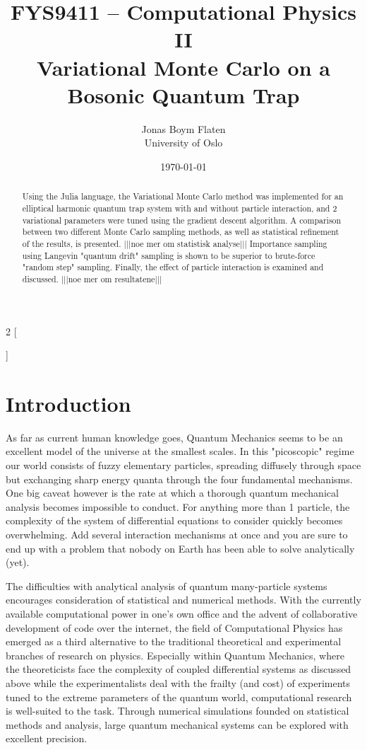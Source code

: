 \documentclass[a4paper,8pt]{article}
\title{\small FYS9411 – Computational Physics II \\
\huge Variational Monte Carlo on a Bosonic Quantum Trap}
\author{\large Jonas Boym Flaten \\
\small University of Oslo}
\date{\today}
\begin{document}
\begin{multicols}{2}
[
\maketitle
\begin{abstract}
Using the Julia language, the Variational Monte Carlo method was implemented for an elliptical harmonic quantum trap system with and without particle interaction, and 2 variational parameters were tuned using the gradient descent algorithm. A comparison between two different Monte Carlo sampling methods, as well as statistical refinement of the results, is presented. |||noe mer om statistisk analyse||| Importance sampling using Langevin "quantum drift" sampling is shown to be superior to brute-force "random step" sampling. Finally, the effect of particle interaction is examined and discussed. |||noe mer om resultatene||| 
\end{abstract}
]

\section{Introduction}

As far as current human knowledge goes, Quantum Mechanics seems to be an excellent model of the universe at the smallest scales. In this "picoscopic" regime our world consists of fuzzy elementary particles, spreading diffusely through space but exchanging sharp energy quanta through the four fundamental mechanisms. One big caveat however is the rate at which a thorough quantum mechanical analysis becomes impossible to conduct. For anything more than 1 particle, the complexity of the system of differential equations to consider quickly becomes overwhelming. Add several interaction mechanisms at once and you are sure to end up with a problem that nobody on Earth has been able to solve analytically (yet).

The difficulties with analytical analysis of quantum many-particle systems encourages consideration of statistical and numerical methods. With the 
currently available computational power in one's own office and the advent of collaborative development of code over the internet, the field of Computational Physics has emerged as a third alternative to the traditional theoretical and experimental branches of research on physics. Especially within Quantum Mechanics, where the theoreticists face the complexity of coupled differential systems as discussed above while the experimentalists deal with the frailty (and cost) of experiments tuned to the extreme parameters of the quantum world, computational research is well-suited to the task. Through numerical simulations founded on statistical methods and analysis, large quantum mechanical systems can be explored with excellent precision.


\end{multicols}
\end{document}

